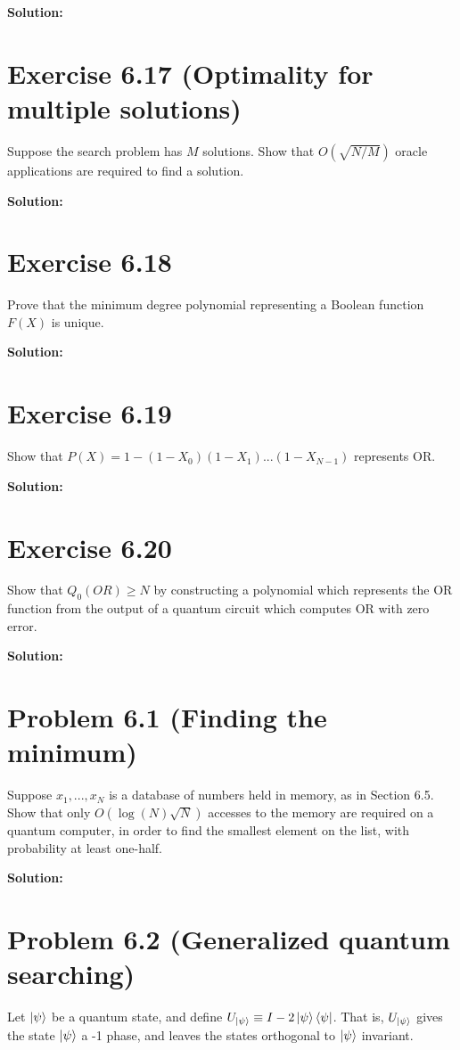 \documentclass{book}
\begin{document}
        \textbf{Solution:}
        
    \section*{Exercise 6.17 (Optimality for multiple solutions)}
        Suppose the search problem has $M$ solutions. Show that $O(\sqrt{N/M})$ oracle applications are required to find a solution. 
        
        \textbf{Solution:}
        
    \section*{Exercise 6.18}
        Prove that the minimum degree polynomial representing a Boolean function $F(X)$ is unique. 
        
        \textbf{Solution:}
    
    \section*{Exercise 6.19}
        Show that $P(X) = 1-(1-X_0)(1-X_1)...(1-X_{N-1})$ represents OR. 
        
        \textbf{Solution:}
    
    \section*{Exercise 6.20}
        Show that $Q_0(OR)\geq N$ by constructing a polynomial which represents the OR function from the output of a quantum circuit which computes OR with zero error.
        
        \textbf{Solution:}
    
    \section*{Problem 6.1 (Finding the minimum)}
        Suppose $x_1,...,x_N$ is a database of numbers held in memory, as in Section 6.5. Show that only $O(\log(N)\sqrt{N})$ accesses to the memory are required on a quantum computer, in order to find the smallest element on the list, with probability at least one-half. 
        
        \textbf{Solution:}
    
    \section*{Problem 6.2 (Generalized quantum searching)}
        Let $\ket{\psi}$ be a quantum state, and define $U_{\ket{\psi}}\equiv I - 2\ket{\psi}\bra{\psi}$. That is, $U_{\ket{\psi}}$ gives the state $\ket{\psi}$ a -1 phase, and leaves the states orthogonal to $\ket{\psi}$ invariant. \par
        
\end{document}
